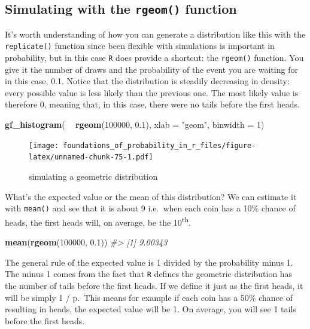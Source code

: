 \documentclass[]{article}
\newenvironment{Shaded}{\begin{snugshade}}{\end{snugshade}}
\newcommand{\CommentTok}[1]{\textcolor[rgb]{0.56,0.35,0.01}{\textit{#1}}}
\newcommand{\DataTypeTok}[1]{\textcolor[rgb]{0.13,0.29,0.53}{#1}}
\newcommand{\DecValTok}[1]{\textcolor[rgb]{0.00,0.00,0.81}{#1}}
\newcommand{\FloatTok}[1]{\textcolor[rgb]{0.00,0.00,0.81}{#1}}
\newcommand{\KeywordTok}[1]{\textcolor[rgb]{0.13,0.29,0.53}{\textbf{#1}}}
\newcommand{\NormalTok}[1]{#1}
\newcommand{\OperatorTok}[1]{\textcolor[rgb]{0.81,0.36,0.00}{\textbf{#1}}}
\newcommand{\StringTok}[1]{\textcolor[rgb]{0.31,0.60,0.02}{#1}}
\begin{document}
\hypertarget{simulating-with-the-rgeom-function}{%
\subsection{\texorpdfstring{Simulating with the \texttt{rgeom()}
function}{Simulating with the rgeom() function}}\label{simulating-with-the-rgeom-function}}

It's worth understanding of how you can generate a distribution like
this with the \texttt{replicate()} function since been flexible with
simulations is important in probability, but in this case \texttt{R}
does provide a shortcut: the \texttt{rgeom()} function. You give it the
number of draws and the probability of the event you are waiting for in
this case, 0.1. Notice that the distribution is steadily decreasing in
density: every possible value is less likely than the previous one. The
most likely value is therefore 0, meaning that, in this case, there were
no tails before the first heads.

\begin{Shaded}
\begin{Highlighting}[]
\KeywordTok{gf_histogram}\NormalTok{( }\OperatorTok{~}\StringTok{ }\KeywordTok{rgeom}\NormalTok{(}\DecValTok{100000}\NormalTok{, }\FloatTok{0.1}\NormalTok{), }\DataTypeTok{xlab =} \StringTok{"geom"}\NormalTok{, }\DataTypeTok{binwidth =} \DecValTok{1}\NormalTok{) }
\end{Highlighting}
\end{Shaded}

\begin{figure}
\centering
\texttt{[image: foundations\_of\_probability\_in\_r\_files/figure-latex/unnamed-chunk-75-1.pdf]}
\caption{simulating a geometric distribution}
\end{figure}

What's the expected value or the mean of this distribution? We can
estimate it with \texttt{mean()} and see that it is about 9 i.e.~when
each coin has a 10\% chance of heads, the first heads will, on average,
be the 10\textsuperscript{th}.

\begin{Shaded}
\begin{Highlighting}[]
\KeywordTok{mean}\NormalTok{(}\KeywordTok{rgeom}\NormalTok{(}\DecValTok{100000}\NormalTok{, }\FloatTok{0.1}\NormalTok{))}
\CommentTok{#> [1] 9.00343}
\end{Highlighting}
\end{Shaded}

The general rule of the expected value is 1 divided by the probability
minus 1. The minus 1 comes from the fact that \texttt{R} defines the
geometric distribution has the number of tails before the first heads.
If we define it just as the first heads, it will be simply 1 / p.~This
means for example if each coin has a 50\% chance of resulting in heads,
the expected value will be 1. On average, you will see 1 tails before
the first heads.
\end{document}
